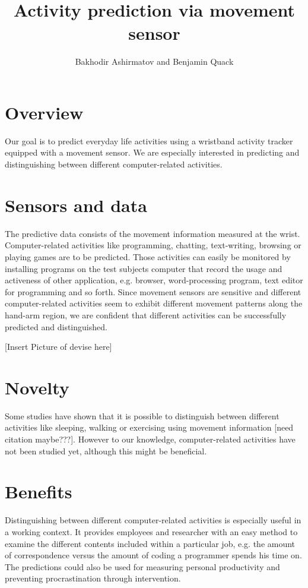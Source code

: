 \documentclass[11pt,a4paper]{paper}
\title{Activity prediction via movement sensor}
\author{Bakhodir Ashirmatov and Benjamin Quack}
\begin{document}
\maketitle

\section{Overview}

Our goal is to predict everyday life activities using a wristband activity tracker equipped 
 with a movement sensor.
We are especially interested in predicting and distinguishing between 
 different computer-related activities.
 
\section{Sensors and data}
 
The predictive data consists of the movement information measured at the wrist.
Computer-related activities like programming, chatting, text-writing,
 browsing or playing games are to be predicted.
Those activities can easily be monitored by installing programs on the 
 test subjects computer that record the usage and activeness of other 
 application, e.g. browser, word-processing program, text editor for programming 
 and so forth.
Since movement sensors are sensitive and different computer-related activities
 seem to exhibit different movement patterns along the hand-arm region, 
 we are confident that different activities can be
 successfully predicted and distinguished.
 
 [Insert Picture of devise here]
 
\section{Novelty}

Some studies have shown that it is possible to distinguish between different 
 activities like sleeping, walking or exercising using movement information [need citation maybe???].
However to our knowledge, computer-related activities have not been studied yet, 
 although this might be beneficial.
  
  
\section{Benefits}

Distinguishing between different computer-related activities is especially 
 useful in a working context. 
It provides employees and researcher with an easy method to examine 
 the different contents included within a particular job, e.g.
 the amount of correspondence versus the amount of coding a programmer 
 spends his time on.
The predictions could also be used for measuring personal productivity 
 and preventing procrastination through intervention.

\end{document}
